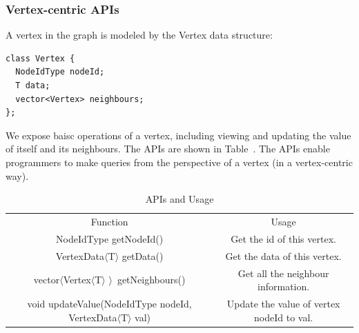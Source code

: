 \documentclass[11pt]{article}
\begin{document}
\subsubsection{Vertex-centric APIs}
A vertex in the graph is modeled by the \textsf{Vertex} data structure:
\begin{verbatim}
class Vertex {
  NodeIdType nodeId;
  T data;
  vector<Vertex> neighbours;
};
\end{verbatim}
We expose baisc operations of a vertex, including viewing and updating the 
value of itself and its neighbours. The APIs are shown in 
Table~\cite{table:api}. The APIs enable programmers to make queries 
from the perspective of a vertex (in a vertex-centric way). 
\begin{table}
  \centering
 \begin{tabular}{|c|c|}
 \hline
 \hline
 Function & Usage\\
 NodeIdType getNodeId() & Get the id of this vertex.\\
 VertexData$\langle$T$\rangle$ getData() & Get the data of this vertex.\\
 vector$\langle$Vertex$\langle$T$\rangle$ $\rangle$\ getNeighbours() & Get all 
the neighbour information.\\
 void updateValue(NodeIdType nodeId, VertexData$\langle$T$\rangle$ val) & Update 
the value of vertex nodeId to val.\\
 \hline
 \hline
 \end{tabular}
 \caption{APIs and Usage}
 \label{table:api}
\end{table}
\end{document}
